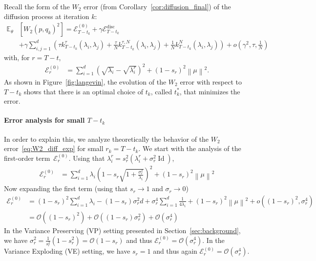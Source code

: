 \documentclass[11pt]{article}
\newcommand{\norm}[1]{\left\|{#1}\right\|}
\newcommand{\id}{\operatorname{Id}}
\begin{document}
Recall the form of the $W_2$ error (from Corollary~\ref{cor:diffusion_final}) of the diffusion process at iteration $k$: 
\begin{equation} \label{eq:W2_diff_exp}
\begin{split} 
     \mathbb{E}_{\theta}&\left[W_2\left(p, q_k\right)^2\right] = 
 \mathcal{E}^{(0)}_{T-t_k} + \gamma \mathcal{E}^{\text{disc}}_{T-t_k} \\[-0.2cm] &+ \gamma \sum_{i,j = 1}^d \left(\tau k_{T-t_k}^\tau (\lambda_i, \lambda_j)  + \frac{\tau}{N} k_{T-t_k}^{\tau, N}(\lambda_i, \lambda_j) +\frac{1}{N} k_{T-t_k}^N(\lambda_i, \lambda_j)\right)  + o\left( \gamma^2, \tau, \frac{1}{N} \right)
\end{split} 
 \end{equation}
with, for $r = T-t$,
\begin{align*}
\mathcal{E}^{(0)}_{r} &=  \sum_{i=1}^d \left(\sqrt{\lambda_i} - \sqrt{\lambda^r_i}\right)^2 +  (1- s_{r})^2\norm{\mu}^2. %
\end{align*}
As shown in Figure~\ref{fig:langevin}, the evolution of the $W_2$ error with respect to $T-t_k$ shows that there is an optimal choice of $t_k$, called $t_k^*$, that minimizes the error.



\paragraph{Error analysis for small $T-t_k$}  In order to explain this, we analyze theoretically the behavior of the $W_2$ error~\eqref{eq:W2_diff_exp} for small $r_k = T-t_k$. We start with the analysis of the first-order term~$\mathcal{E}^{(0)}_{r}$. Using that ${\lambda^r_i = s_r^2(\lambda^r_i + \sigma_r^2 \id)}$, 
\begin{align*}
\mathcal{E}^{(0)}_{r} &= \sum_{i=1}^d \lambda_i \left(1 - s_r\sqrt{1 + \frac{\sigma_r^2}{\lambda_i}}\right)^2 + (1- s_{r})^2\norm{\mu}^2
\end{align*}
Now expanding the first term (using that $s_r \to 1$ and $\sigma_r \to 0$)
\begin{align*}
\mathcal{E}^{(0)}_{r} &=  (1- s_{r})^2 \sum_{i=1}^d \lambda_i - (1-s_r)\sigma_r^2 d + \sigma_r^4 \sum_{i=1}^d \frac{1}{4 \lambda_i} +   (1- s_{r})^2\norm{\mu}^2 + o((1-s_r)^2, \sigma_r^4) \\
&= \mathcal{O}((1- s_{r})^2) + \mathcal{O}((1- s_{r})\sigma_r^2) + \mathcal{O}(\sigma_r^4)
\end{align*}
 In the Variance Preserving (VP) setting presented in Section~\ref{sec:background}, we have $\sigma_r^2 = \frac{1}{s_r^2} (1 - s_r^2) =  \mathcal{O}(1- s_{r})$ and thus $\mathcal{E}^{(0)}_{r} = \mathcal{O}(\sigma_r^4)$. In the Variance Exploding (VE) setting, we have $s_r = 1$ and thus again ${\mathcal{E}^{(0)}_{r} = \mathcal{O}(\sigma_r^4)}$. 
 
\end{document}
